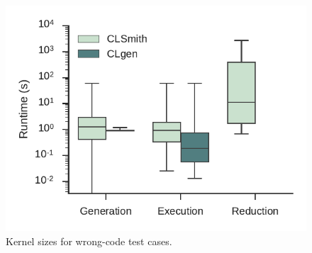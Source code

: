 \begin{figure}
  \centering %
    \includegraphics[width=\columnwidth]{build/img/runtimes}%
  \caption{%
  	Kernel sizes for wrong-code test cases. %
  }%
  \label{fig:kernel-sizes} %
\end{figure}
